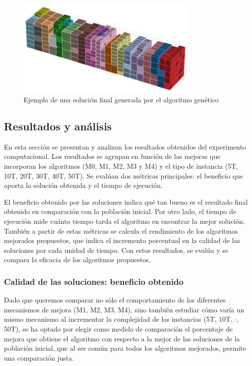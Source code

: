 \documentclass[openany]{article}
\begin{document}
\begin{figure}[H]
    \centering
    \includegraphics[width=0.8\textwidth]{Figures/ejemplo_solucion.eps}
    \caption{Ejemplo de una solución final generada por el algoritmo genético}
    \label{fig:ejemplo_solucion}
\end{figure}

\subsection{Resultados y análisis}

En esta sección se presentan y analizan los resultados obtenidos del experimento computacional. Los resultados se agrupan en función de las mejoras que incorporan los algoritmos (M0, M1, M2, M3 y M4) y el tipo de instancia (5T, 10T, 20T, 30T, 40T, 50T). Se evalúan dos métricas principales: el beneficio que aporta la solución obtenida y el tiempo de ejecución.

El beneficio obtenido por las soluciones indica qué tan bueno es el resultado final obtenido en comparación con la población inicial. Por otro lado, el tiempo de ejecución mide cuánto tiempo tarda el algoritmo en encontrar la mejor solución. También a partir de estas métricas se calcula el rendimiento de los algoritmos mejorados propuestos, que indica el incremento porcentual en la calidad de las soluciones por cada unidad de tiempo. Con estos resultados, se evalúa y se compara la eficacia de los algoritmos propuestos.

\subsubsection{Calidad de las soluciones: beneficio obtenido}

Dado que queremos comparar no sólo el comportamiento de los diferentes mecanismos de mejora (M1, M2, M3, M4), sino también estudiar cómo varía un mismo mecanismo al incrementar la complejidad de las instancias (5T, 10T, $\cdot$, 50T), se ha optado por elegir como medida de comparación el porcentaje de mejora que obtiene el algoritmo con respecto a la mejor de las soluciones de la población inicial, que al ser común para todos los algoritmos mejorados, permite una comparación justa.
\end{document}
